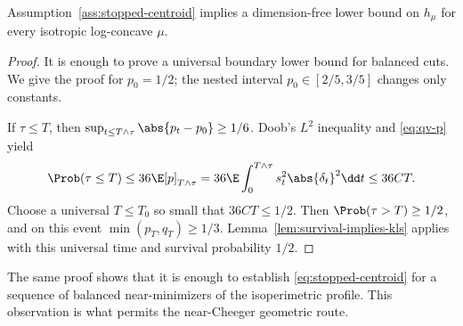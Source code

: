 \documentclass[../../main.tex]{subfiles}
\begin{document}
\begin{theorem}
\label{thm:centroid-implies-kls}
Assumption~\ref{ass:stopped-centroid} implies a dimension-free lower bound on $h_\mu$ for every
isotropic log-concave $\mu$.
\end{theorem}

\begin{proof}
It is enough to prove a universal boundary lower bound for balanced cuts. We give the proof for
$p_0=1/2$; the nested interval $p_0\in[2/5,3/5]$ changes only constants.

If $\tau\le T$, then $\sup_{t\le T\wedge\tau}\abs{p_t-p_0}\ge1/6$. Doob's $L^2$ inequality and
\eqref{eq:qv-p} yield
\[
  \Prob(\tau\le T)
  \le36\E[p]_{T\wedge\tau}
  =36\E\int_0^{T\wedge\tau}s_t^2\abs{\delta_t}^2\dd t
  \le36CT .
\]
Choose a universal $T\le T_0$ so small that $36CT\le1/2$. Then $\Prob(\tau>T)\ge1/2$, and on this
event $\min(p_T,q_T)\ge1/3$. Lemma~\ref{lem:survival-implies-kls} applies with this universal
time and survival probability $1/2$.
\end{proof}

The same proof shows that it is enough to establish \eqref{eq:stopped-centroid} for a sequence of
balanced near-minimizers of the isoperimetric profile. This observation is what permits the
near-Cheeger geometric route.
\end{document}
